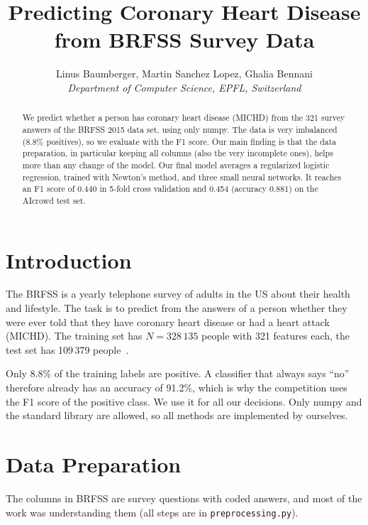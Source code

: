 \documentclass[10pt,conference,compsocconf]{IEEEtran}
\begin{document}
\title{Predicting Coronary Heart Disease from BRFSS Survey Data}

\author{
  Linus Baumberger, Martin Sanchez Lopez, Ghalia Bennani\\
  \textit{Department of Computer Science, EPFL, Switzerland}
}

\maketitle

\begin{abstract}
  We predict whether a person has coronary heart disease (MICHD) from the 321 survey answers of the BRFSS 2015 data set, using only numpy. The data is very imbalanced (8.8\% positives), so we evaluate with the F1 score. Our main finding is that the data preparation, in particular keeping all columns (also the very incomplete ones), helps more than any change of the model. Our final model averages a regularized logistic regression, trained with Newton's method, and three small neural networks. It reaches an F1 score of 0.440 in 5-fold cross validation and 0.454 (accuracy 0.881) on the AIcrowd test set.
\end{abstract}

\section{Introduction}

The BRFSS is a yearly telephone survey of adults in the US about their health and lifestyle. The task is to predict from the answers of a person whether they were ever told that they have coronary heart disease or had a heart attack (MICHD). The training set has $N = 328\,135$ people with 321 features each, the test set has 109\,379 people~\cite{brfss15}.

Only 8.8\% of the training labels are positive. A classifier that always says ``no'' therefore already has an accuracy of 91.2\%, which is why the competition uses the F1 score of the positive class. We use it for all our decisions. Only numpy and the standard library are allowed, so all methods are implemented by ourselves.

\section{Data Preparation}
\label{sec:prep}

The columns in BRFSS are survey questions with coded answers, and most of the work was understanding them (all steps are in \texttt{preprocessing.py}).
\end{document}
